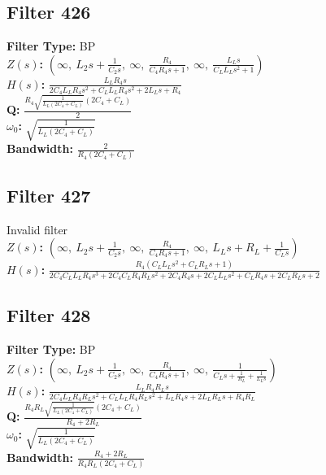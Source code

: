 \documentclass{article}
\begin{document}
\subsection*{Filter 426}
\textbf{Filter Type:} BP \\ 
\textbf{$Z(s)$:} $\left( \infty, \  L_{2} s + \frac{1}{C_{2} s}, \  \infty, \  \frac{R_{4}}{C_{4} R_{4} s + 1}, \  \infty, \  \frac{L_{L} s}{C_{L} L_{L} s^{2} + 1}\right)$ \\ 
\textbf{$H(s)$:} $\frac{L_{L} R_{4} s}{2 C_{4} L_{L} R_{4} s^{2} + C_{L} L_{L} R_{4} s^{2} + 2 L_{L} s + R_{4}}$ \\ 
\textbf{Q:} $\frac{R_{4} \sqrt{\frac{1}{L_{L} \left(2 C_{4} + C_{L}\right)}} \left(2 C_{4} + C_{L}\right)}{2}$ \\ 
\textbf{$\omega_0$:} $\sqrt{\frac{1}{L_{L} \left(2 C_{4} + C_{L}\right)}}$ \\ 
\textbf{Bandwidth:} $\frac{2}{R_{4} \left(2 C_{4} + C_{L}\right)}$ \\ 
\subsection*{Filter 427}
Invalid filter \\ 
\textbf{$Z(s)$:} $\left( \infty, \  L_{2} s + \frac{1}{C_{2} s}, \  \infty, \  \frac{R_{4}}{C_{4} R_{4} s + 1}, \  \infty, \  L_{L} s + R_{L} + \frac{1}{C_{L} s}\right)$ \\ 
\textbf{$H(s)$:} $\frac{R_{4} \left(C_{L} L_{L} s^{2} + C_{L} R_{L} s + 1\right)}{2 C_{4} C_{L} L_{L} R_{4} s^{3} + 2 C_{4} C_{L} R_{4} R_{L} s^{2} + 2 C_{4} R_{4} s + 2 C_{L} L_{L} s^{2} + C_{L} R_{4} s + 2 C_{L} R_{L} s + 2}$ \\ 
\subsection*{Filter 428}
\textbf{Filter Type:} BP \\ 
\textbf{$Z(s)$:} $\left( \infty, \  L_{2} s + \frac{1}{C_{2} s}, \  \infty, \  \frac{R_{4}}{C_{4} R_{4} s + 1}, \  \infty, \  \frac{1}{C_{L} s + \frac{1}{R_{L}} + \frac{1}{L_{L} s}}\right)$ \\ 
\textbf{$H(s)$:} $\frac{L_{L} R_{4} R_{L} s}{2 C_{4} L_{L} R_{4} R_{L} s^{2} + C_{L} L_{L} R_{4} R_{L} s^{2} + L_{L} R_{4} s + 2 L_{L} R_{L} s + R_{4} R_{L}}$ \\ 
\textbf{Q:} $\frac{R_{4} R_{L} \sqrt{\frac{1}{L_{L} \left(2 C_{4} + C_{L}\right)}} \left(2 C_{4} + C_{L}\right)}{R_{4} + 2 R_{L}}$ \\ 
\textbf{$\omega_0$:} $\sqrt{\frac{1}{L_{L} \left(2 C_{4} + C_{L}\right)}}$ \\ 
\textbf{Bandwidth:} $\frac{R_{4} + 2 R_{L}}{R_{4} R_{L} \left(2 C_{4} + C_{L}\right)}$ \\ 
\end{document}
